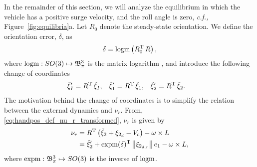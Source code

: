 In the remainder of this section, we will analyze the equilibrium in which the vehicle has a positive surge velocity, and the roll angle is zero, \emph{c.f.,} Figure~\ref{fig:equilibria}a.
Let $R_0$ denote the steady-state orientation.
We define the orientation error, $\delta$, as
\begin{equation}
    \delta = {\rm logm}\left(R_0\T\,R\right),
    \label{eq:handpos_trajectory_delta}
\end{equation}
where ${\rm logm}: SO(3) \mapsto \ball[3]{\pi}$ is the matrix logarithm \cite{iserles_lie_2000}, and introduce the following change of coordinates
\begin{align}
    \tilde{\xi}_I^{\prime} &= R\T\,\tilde{\xi}_I, &
    \tilde{\xi}_1^{\prime} &= R\T\,\tilde{\xi}_1, &
    \tilde{\xi}_2^{\prime} &= R\T\,\tilde{\xi}_2.
\end{align}
The motivation behind the change of coordinates is to simplify the relation between the external dynamics and $\nu_r$.
From, \eqref{eq:handpos_def_nu_r_transformed}, $\nu_r$ is given by
\begin{equation}
    \begin{split}
    \nu_r &= R\T\left(\tilde{\xi}_2 + \xi_{2_d} - V_c\right) - \omega \times L \\
        &= \tilde{\xi}_2^{\prime} + {\rm expm}(\delta)\T \norm{\xi_{2_{d,r}}}e_1 - \omega \times L,
    \end{split}
\end{equation}
where ${\rm expm}: \ball[3]{\pi} \mapsto SO(3)$ is the inverse of ${\rm logm}$.

